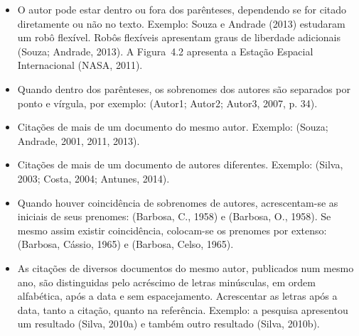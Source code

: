 \begin{itemize}
  \item O autor pode estar dentro ou fora dos parênteses, dependendo se for citado diretamente ou não no texto. Exemplo: Souza e Andrade (2013) estudaram um robô flexível. Robôs flexíveis apresentam graus de liberdade adicionais (Souza; Andrade, 2013). A Figura~4.2 apresenta a Estação Espacial Internacional (NASA, 2011).
  \item Quando dentro dos parênteses, os sobrenomes dos autores são separados por ponto e vírgula, por exemplo: (Autor1; Autor2; Autor3, 2007, p. 34).
  \item Citações de mais de um documento do mesmo autor. Exemplo: (Souza; Andrade, 2001, 2011, 2013).
  \item Citações de mais de um documento de autores diferentes. Exemplo: (Silva, 2003; Costa, 2004; Antunes, 2014).
  \item Quando houver coincidência de sobrenomes de autores, acrescentam-se as iniciais de seus prenomes: (Barbosa, C., 1958) e (Barbosa, O., 1958). Se mesmo assim existir coincidência, colocam-se os prenomes por extenso: (Barbosa, Cássio, 1965) e (Barbosa, Celso, 1965).
  \item As citações de diversos documentos do mesmo autor, publicados num mesmo ano, são distinguidas pelo acréscimo de letras minúsculas, em ordem alfabética, após a data e sem espacejamento. Acrescentar as letras após a data, tanto a citação, quanto na referência. Exemplo: a pesquisa apresentou um resultado (Silva, 2010a) e também outro resultado (Silva, 2010b).
\end{itemize}


